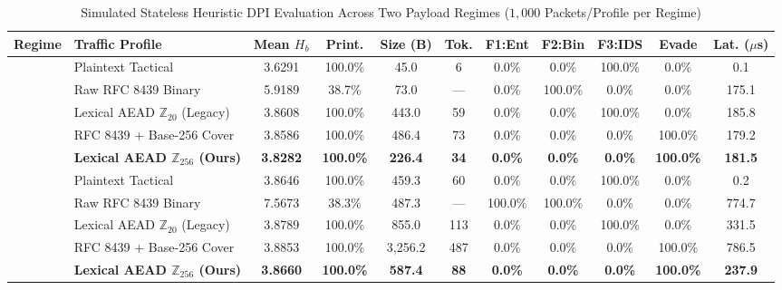 \documentclass[conference]{IEEEtran}
\begin{document}
\begin{table}[t]
\caption{Simulated Stateless Heuristic DPI Evaluation Across Two Payload Regimes ($1{,}000$ Packets/Profile per Regime)}
\label{tab:dpi_eval}
\centering
\begin{tabular}{llccccccccc}
\toprule
\textbf{Regime} & \textbf{Traffic Profile} & \textbf{Mean $H_b$} & \textbf{Print.} & \textbf{Size (B)} & \textbf{Tok.} & \textbf{F1:Ent} & \textbf{F2:Bin} & \textbf{F3:IDS} & \textbf{Evade} & \textbf{Lat. ($\mu$s)} \\
\midrule
{}
& Plaintext Tactical & 3.6291 & 100.0\% & 45.0 & 6 & 0.0\% & 0.0\% & 100.0\% & 0.0\% & 0.1 \\
& Raw RFC 8439 Binary & 5.9189 & 38.7\% & 73.0 & --- & 0.0\% & 100.0\% & 0.0\% & 0.0\% & 175.1 \\
& Lexical AEAD $\mathbb{Z}_{20}$ (Legacy) & 3.8608 & 100.0\% & 443.0 & 59 & 0.0\% & 0.0\% & 100.0\% & 0.0\% & 185.8 \\
& RFC 8439 + Base-256 Cover & 3.8586 & 100.0\% & 486.4 & 73 & 0.0\% & 0.0\% & 0.0\% & 100.0\% & 179.2 \\
& \textbf{Lexical AEAD $\mathbb{Z}_{256}$ (Ours)} & \textbf{3.8282} & \textbf{100.0\%} & \textbf{226.4} & \textbf{34} & \textbf{0.0\%} & \textbf{0.0\%} & \textbf{0.0\%} & \textbf{100.0\%} & \textbf{181.5} \\
\midrule
{}
& Plaintext Tactical & 3.8646 & 100.0\% & 459.3 & 60 & 0.0\% & 0.0\% & 100.0\% & 0.0\% & 0.2 \\
& Raw RFC 8439 Binary & 7.5673 & 38.3\% & 487.3 & --- & 100.0\% & 100.0\% & 0.0\% & 0.0\% & 774.7 \\
& Lexical AEAD $\mathbb{Z}_{20}$ (Legacy) & 3.8789 & 100.0\% & 855.0 & 113 & 0.0\% & 0.0\% & 100.0\% & 0.0\% & 331.5 \\
& RFC 8439 + Base-256 Cover & 3.8853 & 100.0\% & 3,256.2 & 487 & 0.0\% & 0.0\% & 0.0\% & 100.0\% & 786.5 \\
& \textbf{Lexical AEAD $\mathbb{Z}_{256}$ (Ours)} & \textbf{3.8660} & \textbf{100.0\%} & \textbf{587.4} & \textbf{88} & \textbf{0.0\%} & \textbf{0.0\%} & \textbf{0.0\%} & \textbf{100.0\%} & \textbf{237.9} \\
\bottomrule
\end{tabular}
\end{table}
\end{document}
